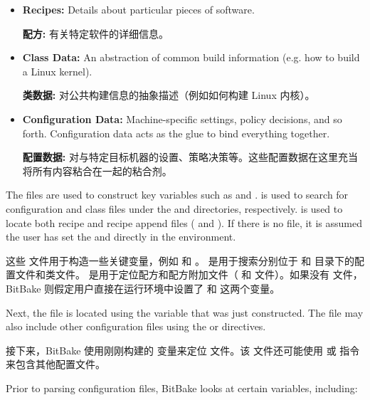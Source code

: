 \begin{itemize}
\setlength\itemsep{1.0em}
\item \textbf{Recipes:} Details about particular pieces of software.

\medskip
\textbf{配方:} 有关特定软件的详细信息。

\item \textbf{Class Data:} An abstraction of common build information (e.g. how to build a Linux kernel).

\medskip
\textbf{类数据:} 对公共构建信息的抽象描述（例如如何构建 Linux 内核）。

\item \textbf{Configuration Data:} Machine-specific settings, policy decisions, and so forth. Configuration data acts as the glue to bind everything together.

\medskip
\textbf{配置数据:} 对与特定目标机器的设置、策略决策等。这些配置数据在这里充当将所有内容粘合在一起的粘合剂。

\end{itemize}

The  files are used to construct key variables such as  and .  is used to search for configuration and class files under the  and  directories, respectively.  is used to locate both recipe and recipe append files ( and ). If there is no  file, it is assumed the user has set the  and  directly in the environment.

这些  文件用于构造一些关键变量，例如  和 。  是用于搜索分别位于  和  目录下的配置文件和类文件。 是用于定位配方和配方附加文件（ 和  文件）。如果没有  文件，BitBake 则假定用户直接在运行环境中设置了  和  这两个变量。

Next, the  file is located using the  variable that was just constructed. The  file may also include other configuration files using the  or  directives.

接下来，BitBake 使用刚刚构建的  变量来定位  文件。该  文件还可能使用  或  指令来包含其他配置文件。

Prior to parsing configuration files, BitBake looks at certain variables, including:

